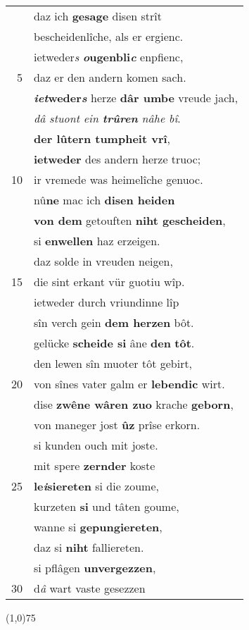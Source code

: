 \documentclass[8pt,a4paper,notitlepage]{article}
\begin{document}
\begin{table}[ht]
\begin{minipage}[t]{0.5\linewidth}
\begin{tabular}{rl}
 & daz ich \textbf{gesage} disen strît\\ 
 & bescheidenlîche, als er ergienc.\\ 
 & ietweder\textit{s} \textbf{\textit{o}ugenbli\textit{c}} enpfienc,\\ 
5 & daz er den andern komen sach.\\ 
 & \textbf{\textit{iet}weder\textit{s}} herze \textbf{dâr umbe} vreude jach,\\ 
 & \textit{dâ stuont ein \textbf{trûren} nâhe bî}.\\ 
 & \textbf{der lûtern tumpheit vrî},\\ 
 & \textbf{ietweder} des andern herze truoc;\\ 
10 & ir vremede was heimelîche genuoc.\\ 
 & nû\textbf{ne} mac ich \textbf{disen heiden}\\ 
 & \textbf{von dem} getouften \textbf{niht gescheiden},\\ 
 & si \textbf{en}\textbf{wellen} haz erzeigen.\\ 
 & daz solde in vreuden neigen,\\ 
15 & die sint erkant vür guotiu wîp.\\ 
 & ietweder durch vriundinne lîp\\ 
 & sîn verch gein \textbf{dem herzen} bôt.\\ 
 & gelücke \textbf{scheide si} âne \textbf{den} \textbf{tôt}.\\ 
 & den lewen sîn muoter tôt gebirt,\\ 
20 & von sînes vater galm er \textbf{lebendic} wirt.\\ 
 & dise \textbf{zwêne wâren zuo} krache \textbf{geborn},\\ 
 & von maneger jost \textbf{ûz} prîse erkorn.\\ 
 & si kunden ouch mit joste.\\ 
 & mit spere \textbf{zernder} koste\\ 
25 & \textbf{le\textit{i}siereten} si die zoume,\\ 
 & kurzeten \textbf{si} und tâten goume,\\ 
 & wanne si \textbf{gepungiereten},\\ 
 & daz si \textbf{niht} falliereten.\\ 
 & si pflâgen \textbf{unvergezzen},\\ 
30 & d\textit{â} wart vaste gesezzen\\ 
\end{tabular}
\scriptsize
\line(1,0){75} \newline

\end{minipage}
\end{table}
\end{document}

